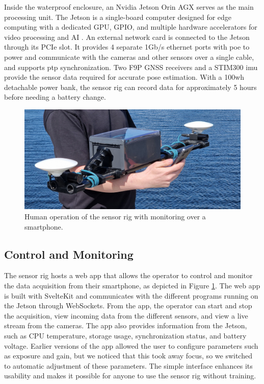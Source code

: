 Inside the waterproof enclosure, an Nvidia Jetson Orin AGX serves as the main processing unit.
The Jetson is a single-board computer designed for edge computing with a dedicated GPU, GPIO, and multiple hardware accelerators for video processing and AI \cite{karumbunathanNVIDIAJetsonAGX2022}.
An external network card is connected to the Jetson through its PCIe slot. 
It provides 4 separate 1Gb/s ethernet ports with \gls{poe} to power and communicate with the cameras and other sensors over a single cable, and supports \gls{ptp} synchronization.
Two F9P GNSS receivers and a STIM300 \gls{imu} provide the sensor data required for accurate pose estimation.
With a 100wh detachable power bank, the sensor rig can record data for approximately 5 hours before needing a battery change.

\begin{figure}[H]

    \centering
    \includegraphics[trim={0 2cm 0 1cm},clip,width=\textwidth]{figures/operation.jpg}
    \caption{Human operation of the sensor rig with monitoring over a smartphone. \label{fig:operation}}
\end{figure}

\subsection{Control and Monitoring}
The sensor rig hosts a web app that allows the operator to control and monitor the data acquisition from their smartphone, as depicted in Figure \ref{fig:operation}.
The web app is built with SvelteKit and communicates with the different programs running on the Jetson through WebSockets.
From the app, the operator can start and stop the acquisition, view incoming data from the different sensors, and view a live stream from the cameras.
The app also provides information from the Jetson, such as CPU temperature, storage usage, synchronization status, and battery voltage.
Earlier versions of the app allowed the user to configure parameters such as exposure and gain, but we noticed that this took away focus, so we switched to automatic adjustment of these parameters.
The simple interface enhances its usability and makes it possible for anyone to use the sensor rig without training.

